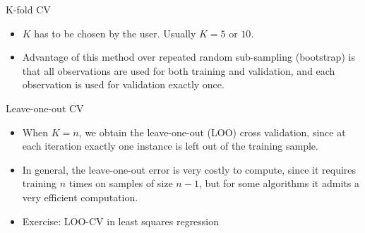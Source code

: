 \documentclass[xcolor={usenames,dvipsnames},handout]{beamer}
\begin{document}
 
 
\begin{frame}{K-fold CV}

\begin{itemize}
\item $K$ has to be chosen by the user. Usually $K=5$ or $10$.
\item Advantage of this method over repeated random sub-sampling (bootstrap) is that all observations are used for both training and validation, and each observation is used for validation exactly once.
\end{itemize}
 
 \begin{block}{Leave-one-out CV}
 \begin{itemize}
\item When $K = n$, we obtain the leave-one-out (LOO) cross validation, since at each iteration exactly one instance is left out of the training sample.

\item In general, the leave-one-out error is very costly to compute, since it requires training $n$ times on samples of size $n-1$, but for some algorithms it admits a very efficient computation.

\item Exercise: LOO-CV in least squares regression
\end{itemize}
\end{block}

\end{frame}
\end{document}
